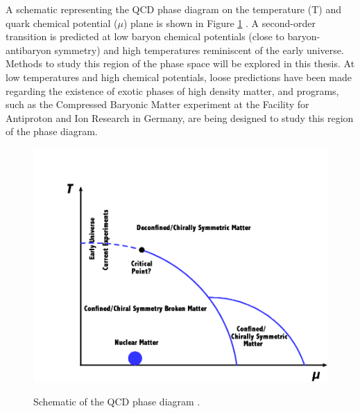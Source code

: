 A schematic representing the QCD phase diagram on the temperature (T) and quark chemical potential ($\mu$) plane is shown in Figure \ref{fig:PhaseDiagram} \cite{1742-6596-761-1-012066}. A second-order transition is predicted at low baryon chemical potentials (close to baryon-antibaryon symmetry) and high temperatures reminiscent of the early universe. Methods to study this region of the phase space will be explored in this thesis. At low temperatures and high chemical potentials, loose predictions have been made regarding the existence of exotic phases of high density matter, and programs, such as the Compressed Baryonic Matter experiment at the Facility for Antiproton and Ion Research in Germany, are being designed to study this region of the phase diagram.
\begin{figure}[h]
  \centering
  \includegraphics[width=5.5in]{figures/1742-6596-761-1-012066.png}\\
  \caption{Schematic of the QCD phase diagram \cite{1742-6596-761-1-012066}.}\label{fig:PhaseDiagram}
\end{figure}


